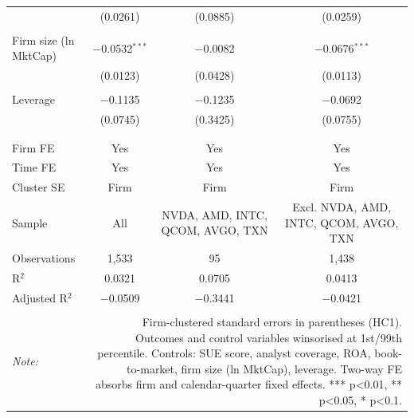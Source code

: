 \begin{table}[!htbp]
\begin{tabular}{@{\extracolsep{5pt}}lccc}
  & (0.0261) & (0.0885) & (0.0259) \\ 
  & & & \\ 
 Firm size (ln MktCap) & $-$0.0532$^{***}$ & $-$0.0082 & $-$0.0676$^{***}$ \\ 
  & (0.0123) & (0.0428) & (0.0113) \\ 
  & & & \\ 
 Leverage & $-$0.1135 & $-$0.1235 & $-$0.0692 \\ 
  & (0.0745) & (0.3425) & (0.0755) \\ 
  & & & \\ 
\hline \\[-1.8ex] 
Firm FE & Yes & Yes & Yes \\ 
Time FE & Yes & Yes & Yes \\ 
Cluster SE & Firm & Firm & Firm \\ 
Sample & All & NVDA, AMD, INTC, QCOM, AVGO, TXN & Excl. NVDA, AMD, INTC, QCOM, AVGO, TXN \\ 
Observations & 1,533 & 95 & 1,438 \\ 
R$^{2}$ & 0.0321 & 0.0705 & 0.0413 \\ 
Adjusted R$^{2}$ & $-$0.0509 & $-$0.3441 & $-$0.0421 \\ 
\hline 
\hline \\[-1.8ex] 
\textit{Note:}  & \multicolumn{3}{r}{Firm-clustered standard errors in parentheses (HC1). Outcomes and control variables winsorised at 1st/99th percentile. Controls: SUE score, analyst coverage, ROA, book-to-market, firm size (ln MktCap), leverage. Two-way FE absorbs firm and calendar-quarter fixed effects. *** p<0.01, ** p<0.05, * p<0.1.} \\ 
\end{tabular} 
\end{table} 
